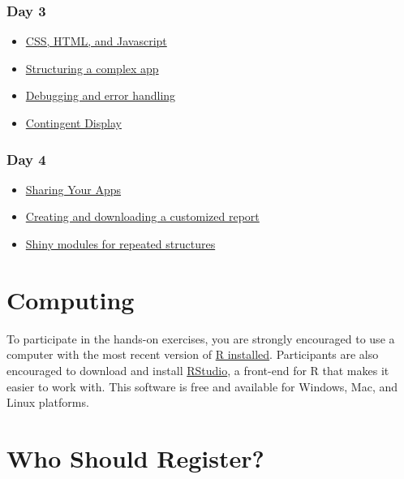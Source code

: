 \documentclass[
  oneside]{book}
\providecommand{\tightlist}{%
  \setlength{\itemsep}{0pt}\setlength{\parskip}{0pt}}
\begin{document}
\hypertarget{day-3}{%
\subsubsection*{Day 3}\label{day-3}}

\begin{itemize}
\tightlist
\item
  \protect\hyperlink{web}{CSS, HTML, and Javascript}
\item
  \protect\hyperlink{structure}{Structuring a complex app}
\item
  \protect\hyperlink{debugging}{Debugging and error handling}
\item
  \protect\hyperlink{contingency}{Contingent Display}
\end{itemize}

\hypertarget{day-4}{%
\subsubsection*{Day 4}\label{day-4}}

\begin{itemize}
\tightlist
\item
  \protect\hyperlink{sharing}{Sharing Your Apps}
\item
  \protect\hyperlink{reports}{Creating and downloading a customized report}
\item
  \protect\hyperlink{modules}{Shiny modules for repeated structures}
\end{itemize}

\hypertarget{computing}{%
\section{Computing}\label{computing}}

To participate in the hands-on exercises, you are strongly encouraged to use a computer with the most recent version of \href{https://www.r-project.org/}{R installed}. Participants are also encouraged to download and install \href{https://www.rstudio.com/products/rstudio/download/}{RStudio}, a front-end for R that makes it easier to work with. This software is free and available for Windows, Mac, and Linux platforms.

\hypertarget{who-should-register}{%
\section{Who Should Register?}\label{who-should-register}}
\end{document}
